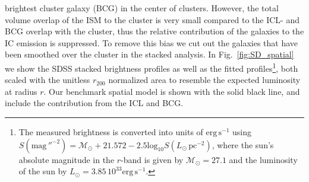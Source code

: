 \documentclass[10pt,aps,pra,reprint,amsmath,amsfonts,amssymb,showpacs]{revtex4-1}
\newcommand{\rmn}{\mathrm}
\newcommand{\rvir}{r_{200}}
\begin{document}
brightest cluster galaxy (BCG) in the center of clusters. However, the
total volume overlap of the ISM to the cluster is very small compared
to the ICL- and BCG overlap with the cluster, thus the relative
contribution of the galaxies to the IC emission is suppressed. To
remove this bias we cut out the galaxies that have been smoothed over
the cluster in the stacked analysis. In Fig.~\ref{fig:SD_spatial} we
show the SDSS stacked brightness profiles as well as the fitted
profiles\footnote{The measured brightness is converted into units of
  $\rmn{erg}\,\rmn{s}^{-1}$ using \cite{2010...book}
  $S(\rmn{mag}\,''^{-2}) =
  \mathcal{M}_\odot+21.572-2.5\rmn{log}_{10}S(L_\odot\,\rmn{pc}^{-2})$,
  where the sun's absolute magnitude in the $r$-band is given by
  $\mathcal{M}_\odot=27.1$ \cite{1998gaas.book.....B} and the
  luminosity of the sun by $L_\odot=3.85\,10^{33}
  \rmn{erg}\,\rmn{s}^{-1}$.}, both scaled with the unitless $\rvir$
normalized area to resemble the expected luminosity at radius
$r$. Our benchmark spatial model is shown with the solid black line,
and include the contribution from the ICL and BCG.
\end{document}
